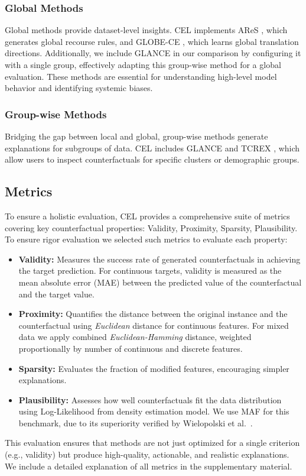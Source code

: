 \documentclass[runningheads]{llncs}
\begin{document}
\subsubsection{Global Methods}
Global methods provide dataset-level insights. CEL implements AReS \cite{rawal2020beyond}, which generates global recourse rules, and GLOBE-CE \cite{ley2023globe}, which learns global translation directions. Additionally, we include GLANCE \cite{kavouras2024glance} in our comparison by configuring it with a single group, effectively adapting this group-wise method for a global evaluation. These methods are essential for understanding high-level model behavior and identifying systemic biases.

\subsubsection{Group-wise Methods}
Bridging the gap between local and global, group-wise methods generate explanations for subgroups of data. CEL includes GLANCE \cite{kavouras2024glance} and TCREX \cite{bewley2024tcrex}, which allow users to inspect counterfactuals for specific clusters or demographic groups.

\subsection{Metrics}
\label{sec:metrics}
To ensure a holistic evaluation, CEL provides a comprehensive suite of metrics covering key counterfactual properties: Validity, Proximity, Sparsity, Plausibility. To ensure rigor evaluation we selected such metrics to evaluate each property:
\begin{itemize}
    \item \textbf{Validity:} Measures the success rate of generated counterfactuals in achieving the target prediction. For continuous targets, validity is measured as the mean absolute error (MAE) between the predicted value of the counterfactual and the target value. 
    \item \textbf{Proximity:} Quantifies the distance between the original instance and the counterfactual using \textit{Euclidean} distance for continuous features. For mixed data we apply combined \textit{Euclidean-Hamming} distance, weighted proportionally by number of continuous and discrete features.
    \item \textbf{Sparsity:} Evaluates the fraction of modified features, encouraging simpler explanations.
    \item \textbf{Plausibility:} Assesses how well counterfactuals fit the data distribution using Log-Likelihood from density estimation model. We use MAF \cite{papamakarios2017masked} for this benchmark, due to its superiority verified by Wielopolski et al.~\cite{wielopolski2024probabilistically}.
\end{itemize}
This evaluation ensures that methods are not just optimized for a single criterion (e.g., validity) but produce high-quality, actionable, and realistic explanations. We include a detailed explanation of all metrics in the supplementary material.
\end{document}
